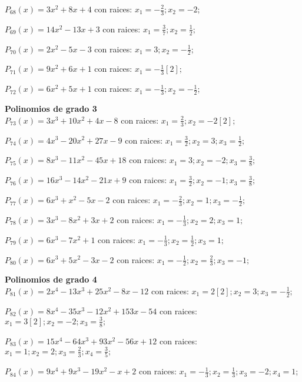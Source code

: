\subitem $P_{68}(x) = 3x^2 + 8x + 4$ con raices: $x_1 = -\frac{2}{3} ; x_2 = -2 ;  $

\subitem $P_{69}(x) = 14x^2 - 13x + 3$ con raices: $x_1 = \frac{3}{7} ; x_2 = \frac{1}{2} ;  $

\subitem $P_{70}(x) = 2x^2 - 5x - 3$ con raices: $x_1 = 3 ; x_2 = -\frac{1}{2} ;  $

\subitem $P_{71}(x) = 9x^2 + 6x + 1$ con raices: $x_1 = -\frac{1}{3}[2] ;  $

\subitem $P_{72}(x) = 6x^2 + 5x + 1$ con raices: $x_1 = -\frac{1}{3} ; x_2 = -\frac{1}{2} ;  $

\textbf{Polinomios de grado 3\\} 
\subitem $P_{73}(x) = 3x^3 + 10x^2 + 4x - 8$ con raices: $x_1 = \frac{2}{3} ; x_2 = -2[2] ;  $

\subitem $P_{74}(x) = 4x^3 - 20x^2 + 27x - 9$ con raices: $x_1 = \frac{3}{2} ; x_2 = 3 ; x_3 = \frac{1}{2} ;  $

\subitem $P_{75}(x) = 8x^3 - 11x^2 - 45x + 18$ con raices: $x_1 = 3 ; x_2 = -2 ; x_3 = \frac{3}{8} ;  $

\subitem $P_{76}(x) = 16x^3 - 14x^2 - 21x + 9$ con raices: $x_1 = \frac{3}{2} ; x_2 = -1 ; x_3 = \frac{3}{8} ;  $

\subitem $P_{77}(x) = 6x^3 + x^2 - 5x - 2$ con raices: $x_1 = -\frac{2}{3} ; x_2 = 1 ; x_3 = -\frac{1}{2} ;  $

\subitem $P_{78}(x) = 3x^3 - 8x^2 + 3x + 2$ con raices: $x_1 = -\frac{1}{3} ; x_2 = 2 ; x_3 = 1 ;  $

\subitem $P_{79}(x) = 6x^3 - 7x^2 + 1$ con raices: $x_1 = -\frac{1}{3} ; x_2 = \frac{1}{2} ; x_3 = 1 ;  $

\subitem $P_{80}(x) = 6x^3 + 5x^2 - 3x - 2$ con raices: $x_1 = -\frac{1}{2} ; x_2 = \frac{2}{3} ; x_3 = -1 ;  $

\textbf{Polinomios de grado 4\\} 
\subitem $P_{81}(x) = 2x^4 - 13x^3 + 25x^2 - 8x - 12$ con raices: $x_1 = 2[2] ; x_2 = 3 ; x_3 = -\frac{1}{2} ;  $

\subitem $P_{82}(x) = 8x^4 - 35x^3 - 12x^2 + 153x - 54$ con raices: $x_1 = 3[2] ; x_2 = -2 ; x_3 = \frac{3}{8} ;  $

\subitem $P_{83}(x) = 15x^4 - 64x^3 + 93x^2 - 56x + 12$ con raices: $x_1 = 1 ; x_2 = 2 ; x_3 = \frac{2}{3} ; x_4 = \frac{3}{5} ;  $

\subitem $P_{84}(x) = 9x^4 + 9x^3 - 19x^2 - x + 2$ con raices: $x_1 = -\frac{1}{3} ; x_2 = \frac{1}{3} ; x_3 = -2 ; x_4 = 1 ;  $

